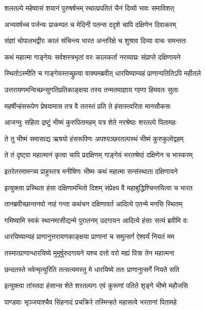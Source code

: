 \twolineshloka
{शलतल्पे महेष्वासं शयानं पुरुषर्षभम्}
{रथात्प्रपतितं चैनं दिव्यो भावः समाविशत्}


\twolineshloka
{अभ्यवर्षच्च पर्जन्यः प्राकम्पत च मेदिनी}
{पतन्स ददृशे चापि दक्षिणेन दिवाकरम्}


\twolineshloka
{संज्ञां चोपालभद्वीरः कालं संचिन्त्य भारत}
{अन्तरिक्षे च शुश्राव दिव्या वाचः समन्ततः}


\twolineshloka
{कथं महात्मा गाङ्गेयः सर्वशस्त्रभृतां वरः}
{कालकर्ता नरव्याघ्रः संप्राप्ते दक्षिणायने}


\twolineshloka
{स्थितोऽस्मीति च गाङ्गेयस्तच्छ्रुत्वा वाक्यमब्रवीत्}
{धारयिष्याम्यहं प्राणान्पतितिऽपि महीतले}


\twolineshloka
{उत्तरायणमन्विच्छन्सुगतिप्रतिकाङ्क्षया}
{तस्य तन्मतमाज्ञाय गह्गा हिमवतः सुताः}


\twolineshloka
{महर्षीन्हंसरूपेण प्रेषयामास तत्र वै}
{ततस्तं प्रति ते हंसास्त्वरिता मानसौकसः}


\twolineshloka
{आजग्मुः सहिता द्रष्टुं भीष्मं कुरुपितामहम्}
{यत्र शेते नरश्रेष्ठः शरतल्पे पितामहः}


\twolineshloka
{ते तु भीष्मं समासाद्य ऋषयो हंसरूपिणः}
{अपश्यञ्छरतल्पस्थं भीष्मं कुरुकुलोद्वहम्}


\twolineshloka
{ते तं दृष्ट्वा महात्मानं कृत्वा चापि प्रदक्षिणम्}
{गाङ्गेयं भरतश्रेष्ठं दक्षिणेन च भास्करम्}


\twolineshloka
{इतरेतरमामन्त्र्य प्राहुस्तत्र मनीषिणः}
{भीष्मः कथं महात्मा सन्संस्थाता दक्षिणायने}


\twolineshloka
{इत्युक्त्वा प्रस्थिता हंसा दक्षिणामभितो दिशम्}
{संप्रेक्ष्य वै महाबुद्धिश्चिन्तयित्वा च भारत}


\twolineshloka
{तानब्रवीच्छान्तनवो नाहं गन्ता कथंचन}
{दक्षिणावर्त आदित्ये एतन्मे मनसि स्थितम्}


\twolineshloka
{गमिष्यामि स्वकं स्थानमासीद्यन्मे पुरातनम्}
{उदगायन आदित्ये हंसाः सत्यं ब्रवीमि वः}


\twolineshloka
{धारयिष्याम्यहं प्राणानुत्तरायणकाङ्क्षया}
{प्राणानां च समुत्सर्ग ऐश्वर्यं नियतं मम}


\twolineshloka
{तस्मात्प्राणान्धारयिष्ये मुमूर्षुरुदगायने}
{यश्च दत्तो वरो मह्यं पित्रा तेन महात्मना}


\twolineshloka
{छन्दतस्ते भवेन्मृत्युरिति तत्सत्यमस्तु मे}
{धारयिष्ये ततः प्राणानुत्सर्गे नियते सति}


\twolineshloka
{इत्युक्त्वा तांस्तदा हंसान्स शेते शरतल्पगः}
{एवं कुरूणां पतिते शृङ्गे भीष्मे महौजसि}


\twolineshloka
{पाण्डवाः सृञ्जयाश्चैव सिंहनादं प्रचक्रिरे}
{तस्मिन्हते महासत्वे भरतानां पितामहे}


